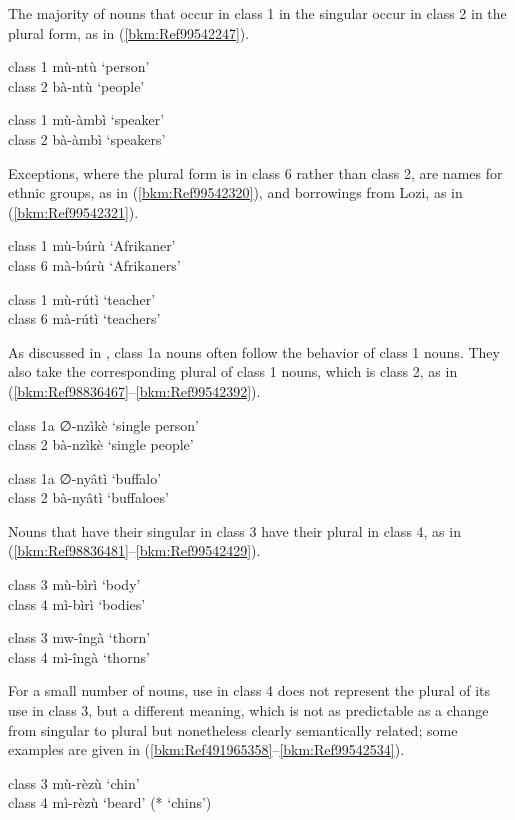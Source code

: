 The majority of nouns that occur in class 1 in the singular occur in class 2 in the plural form, as in (\ref{bkm:Ref99542247}).

\ea
\label{bkm:Ref99542247}
\ea
class 1     mù-ntù   ‘person’\\
class 2    bà-ntù  ‘people’

\ex
class 1    mù-àmbì    ‘speaker’\\
  class 2    bà-àmbì    ‘speakers’
\z\z

Exceptions, where the plural form is in class 6 rather than class 2, are names for ethnic groups, as in (\ref{bkm:Ref99542320}), and borrowings from Lozi, as in (\ref{bkm:Ref99542321}).

\ea
\label{bkm:Ref99542320}
class 1    mù-búrù    ‘Afrikaner’\\
class 6    mà-búrù    ‘Afrikaners’
\z

\ea
\label{bkm:Ref99542321}
class 1    mù-rútì    ‘teacher’\\
class 6    mà-rútì    ‘teachers’
\z

As discussed in , class 1a nouns often follow the behavior of class 1 nouns. They also take the corresponding plural of class 1 nouns, which is class 2, as in (\ref{bkm:Ref98836467}--\ref{bkm:Ref99542392}).

\ea
\label{bkm:Ref98836467}
class 1a  ∅-nzìkè    ‘single person’\\
class 2    bà-nzìkè    ‘single people’
\z

\ea
\label{bkm:Ref99542392}
class 1a  ∅-nyâtì    ‘buffalo’\\
class 2    bà-nyâtì    ‘buffaloes’
\z

Nouns that have their singular in class 3 have their plural in class 4, as in (\ref{bkm:Ref98836481}--\ref{bkm:Ref99542429}).

\ea
\label{bkm:Ref98836481}
class 3    mù-bìrì    ‘body’\\
class 4    mì-bìrì    ‘bodies’
\z

\ea
\label{bkm:Ref99542429}
class 3    mw-îngà    ‘thorn’\\
class 4    mì-îngà    ‘thorns’
\z

For a small number of nouns, use in class 4 does not represent the plural of its use in class 3, but a different meaning, which is not as predictable as a change from singular to plural but nonetheless clearly semantically related; some examples are given in (\ref{bkm:Ref491965358}--\ref{bkm:Ref99542534}).

\ea
\label{bkm:Ref491965358}
class 3    mù-rèzù    ‘chin’\\
class 4    mì-rèzù    ‘beard’ (* ‘chins’)
\z

